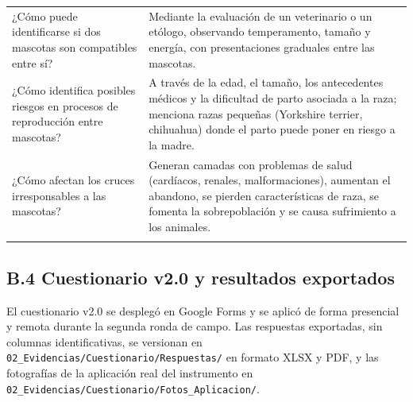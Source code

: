 \documentclass[journal,onecolumn]{IEEEtran}
\begin{document}
{\begin{longtable}{@{}p{5.6cm} p{9.4cm}@{}}
			¿Cómo puede identificarse si dos mascotas son compatibles entre sí? & Mediante la evaluación de un veterinario o un etólogo, observando temperamento, tamaño y energía, con presentaciones graduales entre las mascotas. \\ \addlinespace
			
			¿Cómo identifica posibles riesgos en procesos de reproducción entre mascotas? & A través de la edad, el tamaño, los antecedentes médicos y la dificultad de parto asociada a la raza; menciona razas pequeñas (Yorkshire terrier, chihuahua) donde el parto puede poner en riesgo a la madre. \\ \addlinespace
			
			¿Cómo afectan los cruces irresponsables a las mascotas? & Generan camadas con problemas de salud (cardíacos, renales, malformaciones), aumentan el abandono, se pierden características de raza, se fomenta la sobrepoblación y se causa sufrimiento a los animales. \\ \addlinespace
			
		\end{longtable}
	}

	\subsection*{B.4 Cuestionario v2.0 y resultados exportados}
	
	El cuestionario v2.0 se desplegó en Google Forms y se aplicó de forma
	presencial y remota durante la segunda ronda de campo. Las respuestas
	exportadas, sin columnas identificativas, se versionan en
	\texttt{02\_Evidencias/Cuestionario/Respuestas/} en formato XLSX y PDF, y las
	fotografías de la aplicación real del instrumento en
	\texttt{02\_Evidencias/Cuestionario/Fotos\_Aplicacion/}.
	
\end{document}
